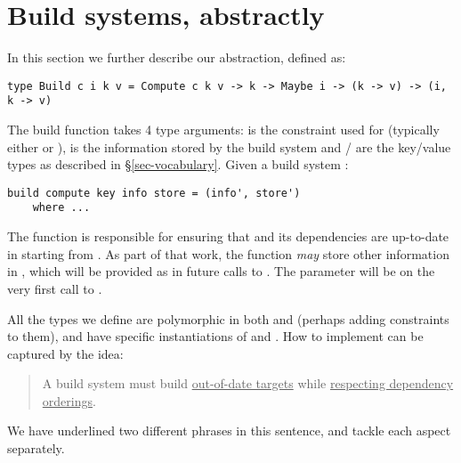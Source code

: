 \section{Build systems, abstractly}\label{sec-build}

In this section we further describe our  abstraction, defined as:

\begin{verbatim}
type Build c i k v = Compute c k v -> k -> Maybe i -> (k -> v) -> (i, k -> v)
\end{verbatim}

The build function takes 4 type arguments:  is the constraint used for  (typically either  or ),  is the information stored by the build system and / are the key/value types as described in \S\ref{sec-vocabulary}. Given a build system :

\begin{verbatim}
build compute key info store = (info', store')
    where ...
\end{verbatim}

The function  is responsible for ensuring that  and its dependencies are up-to-date in  starting from . As part of that work, the  function \textit{may} store other information in , which will be provided as  in future calls to . The  parameter will be  on the very first call to .

All the  types we define are polymorphic in both  and  (perhaps adding constraints to them), and have specific instantiations of  and . How to implement  can be captured by the idea:

\begin{quote}
A build system must build \underline{out-of-date targets} while \underline{respecting dependency orderings}.
\end{quote}




We have underlined two different phrases in this sentence, and tackle each aspect separately.


